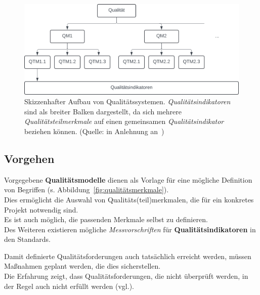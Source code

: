 \begin{figure}
    \centering
    \includegraphics[scale=0.4]{part four/Qualität/img/qualitätssysteme}
    \caption{Skizzenhafter Aufbau von Qualitätssystemen. \textit{Qualitätsindikatoren} sind als breiter Balken dargestellt, da sich mehrere \textit{Qualitätsteilmerkmale} auf einen gemeinsamen \textit{Qualitätsindikator} beziehen können. (Quelle: in Anlehnung an~\cite[Abb. 1.1, 3]{Wed09c})}
    \label{fig:qualitätssysteme}
\end{figure}


\subsection*{Vorgehen}
Vorgegebene \textbf{Qualitätsmodelle} dienen als Vorlage für eine mögliche Definition von Begriffen (s. Abbildung~\ref{fig:qualitätsmerkmale}).\\
Dies ermöglicht die Auswahl von Qualitäts(teil)merkmalen, die für ein konkretes Projekt notwendig sind.\\
Es ist auch möglich, die passenden Merkmale selbst zu definieren.\\

\noindent
Des Weiteren existieren mögliche \textit{Messvorschriften} für \textbf{Qualitätsindikatoren} in den Standards.

\vspace{2mm}
\begin{tcolorbox}
    Damit definierte Qualitätsforderungen auch tatsächlich erreicht werden, müssen Maßnahmen geplant werden, die dies sicherstellen.\\
    Die Erfahrung zeigt, dass Qualitätsforderungen, die nicht überprüft werden, in der Regel auch nicht erfüllt werden (vgl.\cite[4]{Wed09c}).
\end{tcolorbox}
\vspace{2mm}


